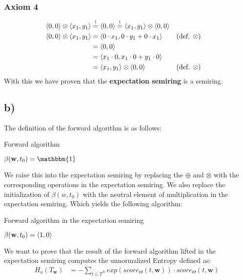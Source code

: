 \documentclass[a4paper,12pt]{ETHexercise}
\begin{document}
\subsubsection*{Axiom 4}
\begin{align}
    \langle0, 0\rangle \otimes \langle x_1, y_1\rangle &\stackrel{!}{=} \langle0, 0\rangle \stackrel{!}{=} \langle x_1, y_1\rangle \otimes \langle0, 0\rangle\\
    \langle0, 0\rangle \otimes \langle x_1, y_1\rangle &= \langle0 \cdot x_1, 0 \cdot y_1 + 0 \cdot x_1\rangle &&(\text{def. }\otimes)\\
    &= \langle0, 0\rangle\\
    &= \langle x_1 \cdot 0, x_1 \cdot 0 + y_1 \cdot 0\rangle \\
    &= \langle x_1, y_1\rangle \otimes \langle0, 0\rangle &&(\text{def. }\otimes)
\end{align}
With this we have proven that the \textbf{expectation semiring} is a semiring.

\subsection*{b)}
The definition of the forward algorithm is as follows:
\begin{algorithm}
    \SetAlgoLined
    \caption{Forward algorithm}
    \label{alg:forward}
    $\beta(\textbf{w}, t_0) = \mathbbm{1}$\\
\end{algorithm}
We raise this into the expectation semiring by replacing the $\oplus$ and $\otimes$ with the corresponding operations in the expectation semiring. We also replace the initialization of $\beta(w, t_0)$ with the neutral element of multiplication in the expectation semiring. Which yields the following algorithm:

\begin{algorithm}
    \SetAlgoLined
    \caption{Forward algorithm in the expectation semiring}
    \label{alg:forward_expectation}
    $\beta(\textbf{w}, t_0) = \langle1, 0\rangle$\\
\end{algorithm}
We want to prove that the result of the forward algorithm lifted in the expectation semiring computes the unnormalized Entropy defined as:
\begin{align}
    H_u(T_\textbf{w}) &= -\sum_{t \in T^N} exp(score_\Theta(t,\textbf{w})) \cdot score_\Theta(t,\textbf{w})\\
\end{align}
\end{document}

